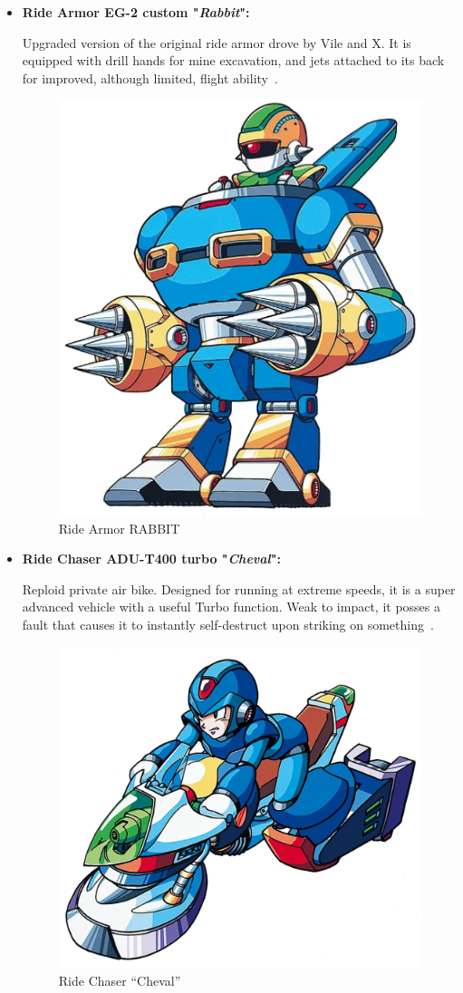\begin{itemize}
	\item \hypertarget{vehicle:Ride_Armor_Rabbit}{\textbf{Ride Armor EG-2 custom "\textit{Rabbit}":}}
	Upgraded version of the original ride armor drove by Vile and X. It is  equipped with drill hands for mine excavation, and jets attached to its back for improved, although limited, flight ability~\cite{wayback:X2_resources}. 
	\begin{figure}[htp]
		\centering
		\includegraphics[width=0.4\linewidth]{figures/X2/Enemies/Ride_armor_RABBIT.png}
		\caption{Ride Armor RABBIT}
	\end{figure}
	
	\item \hypertarget{vehicle:Ride_Chaser_Cheval}{\textbf{Ride Chaser ADU-T400 turbo "\textit{Cheval}": }}
	Reploid private air bike. Designed for running at extreme speeds, 
	it is a super advanced vehicle with a useful Turbo function. Weak to impact, it posses  a fault that causes it to instantly self-destruct upon striking on something~\cite{wayback:X2_resources}.
	\begin{figure}[htp]
		\centering
		\includegraphics[width=0.4\linewidth]{figures/X2/weapons/RCCheval.png}
		\caption{Ride Chaser ``Cheval''}
	\end{figure}
\end{itemize}


